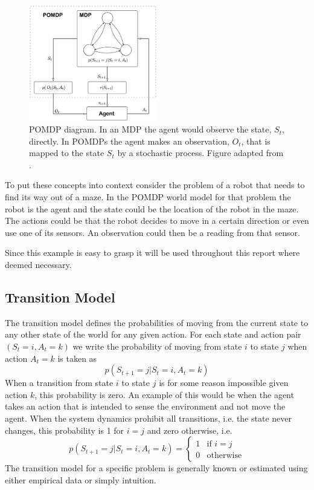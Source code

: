 \begin{figure}[ht]
  \centering
  \includegraphics[width=0.5\textwidth]{figures/pomdp_model}
  \caption{POMDP diagram. In an MDP the agent would observe the state, $S_t$, directly. In POMDPs the agent makes an observation, $O_t$, that is mapped to the state $S_t$ by a stochastic process. Figure adapted from \cite{Aberdeen2003}.}
  \label{fig:POMDPModel}
\end{figure}

To put these concepts into context consider the problem of a robot that needs to find its way out of a maze. In the POMDP world model for that problem the robot is the agent and the state could be the location of the robot in the maze. The actions could be that the robot decides to move in a certain direction or even use one of its sensors. An observation could then be a reading from that sensor.

Since this example is easy to grasp it will be used throughout this report where deemed necessary.

\subsection{Transition Model}
\label{sec:TransitionModel}
The transition model defines the probabilities of moving from the current state to any other state of the world for any given action. For each state and action pair $(S_t = i, A_t = k)$ we write the probability of moving from state $i$ to state $j$ when action $A_t = k$ is taken as
\begin{equation}
  p(S_{t+1} = j|S_t = i, A_t = k)
\end{equation}
When a transition from state $i$ to state $j$ is for some reason impossible given action $k$, this probability is zero. An example of this would be when the agent takes an action that is intended to sense the environment and not move the agent. When the system dynamics prohibit all transitions, i.e. the state never changes, this probability is 1 for $i = j$ and zero otherwise, i.e.
\begin{equation}
\label{eq:IdentityTransitionModel}
  p(S_{t+1} = j|S_t = i, A_t = k) = 
  \begin{cases}
    1 & \text{if $i = j$}\\
    0 & \text{otherwise}
  \end{cases}
\end{equation}
The transition model for a specific problem is generally known or estimated using either empirical data or simply intuition.

